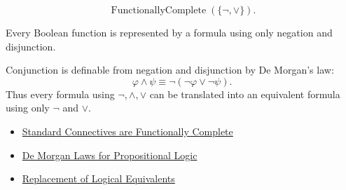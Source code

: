 \begin{remark*}
\[
\operatorname{FunctionallyComplete}(\{\neg,\lor\}).
\]
\end{remark*}



\begin{remark*}[Interpretation]
Every Boolean function is represented by a formula using only negation and
disjunction.

Conjunction is definable from negation and disjunction by De Morgan's law:
\[
\varphi\land\psi\equiv\neg(\neg\varphi\lor\neg\psi).
\]
Thus every formula using \(\neg,\land,\lor\) can be translated into an equivalent
formula using only \(\neg\) and \(\lor\).
\end{remark*}

\begin{dependencies}
\begin{itemize}
  \item \hyperref[thm:standard-connectives-functionally-complete-propositional-logic]{Standard Connectives are Functionally Complete}
  \item \hyperref[thm:de-morgan-laws-propositional-logic]{De Morgan Laws for Propositional Logic}
  \item \hyperref[thm:replacement-of-logical-equivalents-propositional-logic]{Replacement of Logical Equivalents}
\end{itemize}
\end{dependencies}
